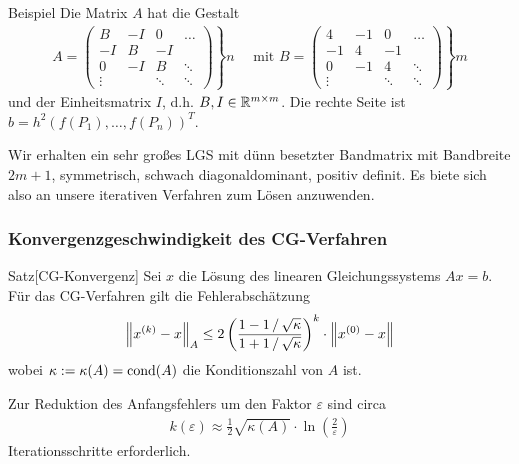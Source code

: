 \begin{colboxBreakable}{Beispiel}
  Die Matrix $A$ hat die Gestalt
  \begin{align*}A = \left.
    \begin{pmatrix}
      B & -I & 0 & \dots\\
      -I & B & -I & \\
      0 & -I & B & \ddots \\
      \vdots& & \ddots & \ddots
    \end{pmatrix}\right\} n \quad \text{ mit } B = \left.\begin{pmatrix}
      4 & -1 & 0 & \dots\\
      -1 & 4 & -1 & \\
      0 & -1 & 4 & \ddots \\
      \vdots& & \ddots & \ddots
    \end{pmatrix}\right\}m
  \end{align*}
  und der Einheitsmatrix $I$, d.h. $B,I\in\mathbb R^{m\times m}$. 
  Die rechte Seite ist $b=h^2(f(P_1),\dots,f(P_n))^T$. 
  
  Wir erhalten ein sehr großes LGS mit dünn besetzter Bandmatrix mit Bandbreite $2m+1$, symmetrisch, 
  schwach diagonaldominant, positiv definit. Es biete sich also an unsere iterativen Verfahren zum Lösen 
  anzuwenden.
\end{colboxBreakable}

\subsubsection{Konvergenzgeschwindigkeit des CG-Verfahren}

\begin{colbox}{Satz}[CG-Konvergenz]\label{satz:CGVconv}
  Sei $x$ die Lösung des linearen Gleichungssystems $Ax=b$. Für das CG-Verfahren gilt die Fehlerabschätzung
  \begin{align*}
    \vertn{2}{x^{(k)} - x}_A 
    \leq 2\left(\dfrac{1-1\,/\,\sqrt{\kappa}}{1+1\,/\,\sqrt{\kappa}}\right)^k \cdot \vertn{2}{x^{(0)}-x}
  \end{align*}
  wobei $\kappa := \kappa(A) = \operatorname*{cond}(A)$ die Konditionszahl von $A$ ist.

  Zur Reduktion des Anfangsfehlers um den Faktor $\varepsilon$ sind circa 
  \begin{align*}
    k(\varepsilon)\approx \tfrac{1}{2}\sqrt{\kappa(A)}\cdot \ln(\tfrac{2}{\varepsilon})
  \end{align*}
  Iterationsschritte erforderlich. 
\end{colbox}

